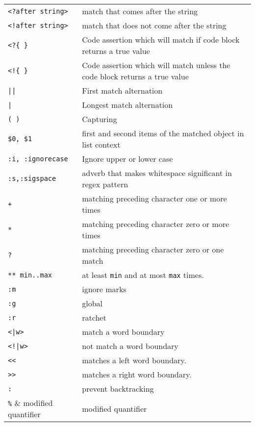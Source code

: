 \documentclass{article}
\begin{document}
\begin{tabular}{ll}
		\verb|<?after string>|	& match that comes after the string\\
		\verb|<!after string>|	& match that does not come after the string\\
		\verb|<?{ }|	& Code assertion which will match if code block returns a true value\\
		\verb|<!{ }|	& Code assertion which will match unless the code block returns a true value\\
		\verb!||!	& First match alternation\\
		\verb!|!	& Longest match alternation\\
		\verb|( )|	& Capturing\\
		\verb|$0, $1|	& first and second items of the matched object in list context\\
		\verb|:i, :ignorecase|	& Ignore upper or lower case\\
		\verb|:s,:sigspace|	& adverb that makes whitespace significant in regex pattern\\
		
		\verb|+|	& matching preceding character one or more times\\
		\verb|*|	& matching preceding character zero or more times\\
		\verb|?|	& matching preceding character zero or one match\\
		\verb|** min..max|	& at least \verb|min| and at most \verb|max| times.\\		
		\verb|:m|   & ignore marks\\
		\verb|:g|   & global\\
		\verb|:r|   & ratchet\\
		\verb!<|w>! & match a word boundary\\
		\texttt{<!|w>} & not match a word boundary\\
		\verb|<<| & matches a left word boundary.\\
		\verb|>>| & matches a right word boundary.\\
		\verb|:| & prevent backtracking\\
		\verb|%| & modified quantifier\\
		
	\end{tabular}\\
\end{document}
